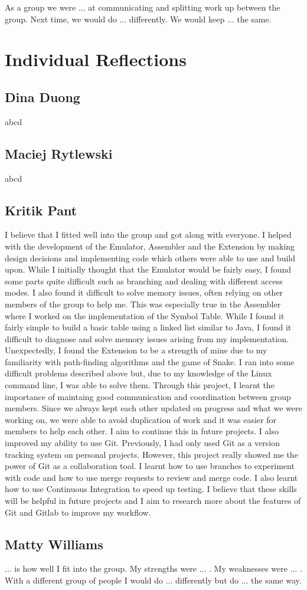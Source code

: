 \documentclass[11pt]{article}
\begin{document}
As a group we were ... at communicating and splitting work up between the group.
Next time, we would do ... differently. We would keep ... the same.

\section{Individual Reflections}

\subsection{Dina Duong}

abcd

\subsection{Maciej Rytlewski}

abcd

\subsection{Kritik Pant}

I believe that I fitted well into the group and got along with everyone. I helped with the development of the Emulator, Assembler and the Extension by 
making design decisions and implementing code which others were able to use and build upon. While I initially thought that the Emulator would be fairly easy, 
I found some parts quite difficult such as branching and dealing with different access modes. I also found it difficult to solve memory issues, often relying on 
other members of the group to help me. This was especially true in the Assembler where I worked on the implementation of the Symbol Table. While I found it fairly 
simple to build a basic table using a linked list similar to Java, I found it difficult to diagnose and solve memory issues arising from my implementation. 
Unexpectedly, I found the Extension to be a strength of mine due to my familiarity with path-finding algorithms and the game of Snake. I ran into some difficult 
problems described above but, due to my knowledge of the Linux command line, I was able to solve them.
\newline
Through this project, I learnt the importance of maintaing good communication and coordination between group members. Since we always kept each other updated 
on progress and what we were working on, we were able to avoid duplication of work and it was easier for members to help each other. I aim to continue this in 
future projects. I also improved my ability to use Git. Previously, I had only used Git as a version tracking system on personal projects. However, this project 
really showed me the power of Git as a collaboration tool. I learnt how to use branches to experiment with code and how to use merge requests to review and merge code. 
I also learnt how to use Continuous Integration to speed up testing. I believe that these skills will be helpful in future projects and I aim to research more about 
the features of Git and Gitlab to improve my workflow.

\subsection{Matty Williams}

... is how well I fit into the group.
My strengths were ... .
My weaknesses were ... .
With a different group of people I would do ... differently but do ... the same way. 
\end{document}
